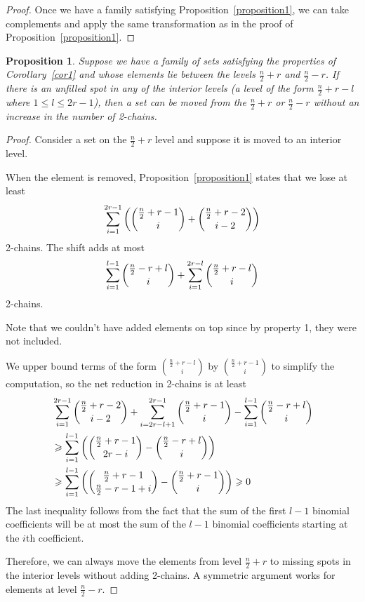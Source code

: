 \documentclass[12pt]{article}
\theoremstyle{plain}
\newtheorem{proposition}[theorem]{Proposition}
\theoremstyle{definition}
\theoremstyle{remark}
\begin{document}
\begin{proof}
Once we have a family satisfying Proposition~\ref{proposition1}, we can take complements and apply the same transformation as in the proof of Proposition~\ref{proposition1}.
\end{proof}


\begin{proposition}
\label{proposition2}
Suppose we have a family of sets satisfying the properties of Corollary~\ref{cor1} and whose elements lie between the levels $\frac{n}{2} + r$ and $\frac{n}{2} - r$. If there is an unfilled spot in any of the interior levels (a level of the form $\frac{n}{2} + r - l$ where $1 \leq l \leq 2r - 1$), then a set can be moved from the $\frac{n}{2} + r$ or $\frac{n}{2} - r$ without an increase in the number of 2-chains.
\end{proposition}

\begin{proof}
Consider a set on the $\frac{n}{2} + r$ level and suppose it is moved to an interior level.

When the element is removed, Proposition~\ref{proposition1} states that we lose at least
\[ \sum_{i=1}^{2r-1} \left(\dbinom{\frac{n}{2} +r-1}{i} + \dbinom{\frac{n}{2} + r-2}{i-2}\right) \]
2-chains. The shift adds at most
\[ \sum_{i=1}^{l-1}\dbinom{\frac{n}{2}-r + l}{i} + \sum_{i=1}^{2r-l} \dbinom{\frac{n}{2}+r-l}{i} \]
2-chains.

Note that we couldn't have added elements on top since by property 1, they were not included.

We upper bound terms of the form $\binom{\frac{n}{2}+r-l}{i}$ by $\binom{\frac{n}{2}+r-1}{i}$ to simplify the computation, so the net reduction in 2-chains is at least
\begin{align*}
&\sum_{i=1}^{2r-1} \dbinom{\frac{n}{2}+r-2}{i-2} + \sum_{i=2r-l+1}^{2r-1} \dbinom{\frac{n}{2}+r-1}{i} - \sum_{i=1}^{l-1} \dbinom{\frac{n}{2}-r+l}{i}\\
& \geq \sum_{i=1}^{l-1} \left(\dbinom{\frac{n}{2}+r-1}{2r-i} - \dbinom{\frac{n}{2}-r+l}{i}\right) \\
 &\geq  \sum_{i=1}^{l-1} \left(\dbinom{\frac{n}{2}+r-1}{\frac{n}{2}-r-1+i} - \dbinom{\frac{n}{2}+r-1}{i}\right) \geq 0
\end{align*}
The last inequality follows from the fact that the sum of the first $l-1$ binomial coefficients will be at most the sum of the $l-1$ binomial coefficients starting at the $i$th coefficient.

Therefore, we can always move the elements from level $\frac{n}{2}+r$ to missing spots in the interior levels without adding 2-chains. A symmetric argument works for elements at level $\frac{n}{2} - r$.
\end{proof}
\end{document}
